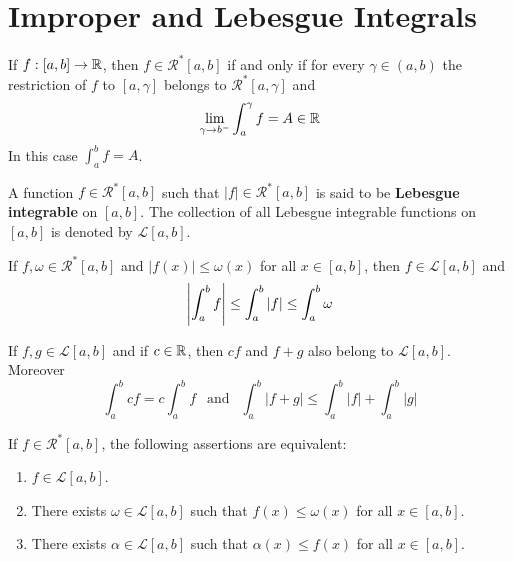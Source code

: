 \section{Improper and Lebesgue Integrals}

\begin{theorem}
	If $f:[a,b] \to \mathbb{R}$, then $f \in \mathcal{R}^*[a,b]$ if and only if for every $\gamma \in (a,b)$ the restriction of $f$ to $[a,\gamma]$ belongs to $\mathcal{R}^*[a,\gamma]$ and
	\[\lim\limits_{\gamma \to b^-}\displaystyle\int_{a}^{\gamma}f=A\in\mathbb{R}\]
	In this case $\displaystyle\int_{a}^{b}f=A$.
\end{theorem}

\begin{definition}
	A function $f \in \mathcal{R}^*[a,b]$ such that $|f| \in \mathcal{R}^*[a,b]$ is said to be \textbf{Lebesgue integrable} on $[a,b]$. The collection of all Lebesgue integrable functions on $[a,b]$ is denoted by $\mathcal{L}[a,b]$.
\end{definition}

\begin{theorem}
	If $f,\omega \in \mathcal{R}^*[a,b]$ and $|f(x)| \leq \omega(x)$ for all $x \in [a,b]$, then $f \in \mathcal{L}[a,b]$ and
	\[\left\lvert \displaystyle\int_{a}^{b}f \right\rvert\leq\displaystyle\int_{a}^{b}|f| \leq\displaystyle\int_{a}^{b}\omega\]
\end{theorem}

\begin{theorem}
	If $f,g \in \mathcal{L}[a,b]$ and if $c \in \mathbb{R}$, then $cf$ and $f+g$ also belong to $\mathcal{L}[a,b]$. Moreover
	\[\displaystyle\int_{a}^{b}cf=c\displaystyle\int_{a}^{b}f\ \ \text{  and  }\ \ \displaystyle\int_{a}^{b}|f+g|\leq\displaystyle\int_{a}^{b}|f|+\displaystyle\int_{a}^{b}|g|\]
\end{theorem}

\begin{theorem}
	If $f \in \mathcal{R}^*[a,b]$, the following assertions are equivalent:
	\begin{enumerate}
		\item $f \in \mathcal{L}[a,b]$.
		\item There exists $\omega \in \mathcal{L}[a,b]$ such that $f(x)\leq\omega(x)$ for all $x \in [a,b]$.
		\item There exists $\alpha \in \mathcal{L}[a,b]$ such that $\alpha(x) \leq f(x)$ for all $x \in [a,b]$.
	\end{enumerate}
\end{theorem}

